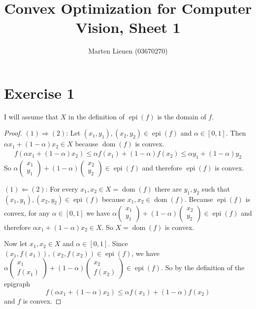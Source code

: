 \documentclass[10pt,a4paper]{article}
\title{Convex Optimization for Computer Vision, Sheet 1}
\author{Marten Lienen (03670270)}
\DeclareMathOperator{\epi}{epi}
\DeclareMathOperator{\dom}{dom}
\begin{document}
\maketitle

\section*{Exercise 1}

I will assume that $X$ in the definition of $\epi(f)$ is the domain of $f$.

\begin{proof}
  $(1) \Rightarrow (2)$: Let $(x_{1}, y_{1}), (x_{2}, y_{2}) \in \epi(f)$ and $\alpha \in [0, 1]$.
  Then $\alpha x_{1} + (1 - \alpha) x_{2} \in X$ because $\dom(f)$ is convex.
  \begin{align*}
    f\left( \alpha x_{1} + (1 - \alpha) x_{2} \right) \le \alpha f(x_{1}) + (1 - \alpha) f(x_{2}) \le \alpha y_{1} + (1 - \alpha) y_{2}
  \end{align*}
  So $\alpha \begin{pmatrix}x_{1}\\y_{1}\end{pmatrix} + (1 - \alpha) \begin{pmatrix}x_{2}\\y_{2}\end{pmatrix} \in \epi(f)$ and therefore $\epi(f)$ is convex.

  $(1) \Leftarrow (2)$: For every $x_{1}, x_{2} \in X = \dom(f)$ there are $y_{1}, y_{2}$ such that $(x_{1}, y_{1}), (x_{2}, y_{2}) \in \epi(f)$ because $x_{1}, x_{2} \in \dom(f)$.
  Because $\epi(f)$ is convex, for any $\alpha \in [0, 1]$ we have $\alpha \begin{pmatrix}x_{1}\\y_{1}\end{pmatrix} + (1 - \alpha) \begin{pmatrix}x_{2}\\y_{2}\end{pmatrix} \in \epi(f)$ and therefore $\alpha x_{1} + (1 - \alpha) x_{2} \in X$.
  So $X = \dom(f)$ is convex.

  Now let $x_{1}, x_{2} \in X$ and $\alpha \in [0, 1]$.
  Since $(x_{1}, f(x_{1})), (x_{2}, f(x_{2})) \in \epi(f)$, we have $\alpha \begin{pmatrix}x_{1}\\f(x_{1})\end{pmatrix} + (1 - \alpha) \begin{pmatrix}x_{2}\\f(x_{2})\end{pmatrix} \in \epi(f)$.
  So by the definition of the epigraph
  \begin{equation*}
    f(\alpha x_{1} + (1 - \alpha) x_{2}) \le \alpha f(x_{1}) + (1 - \alpha) f(x_{2})
  \end{equation*}
  and $f$ is convex.
\end{proof}
\end{document}

